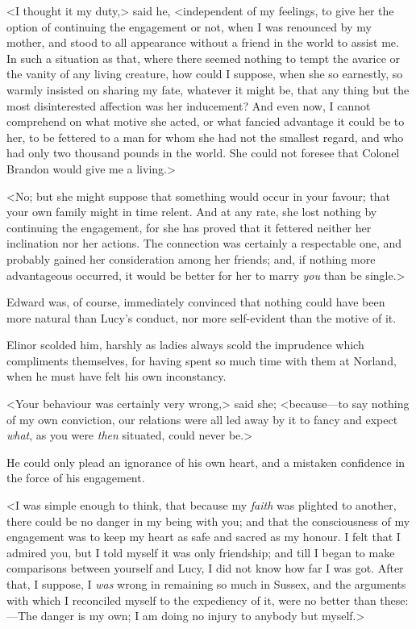 <I thought it my duty,> said he, <independent of my feelings, to give her the option of continuing the engagement or not, when I was renounced by my mother, and stood to all appearance without a friend in the world to assist me. In such a situation as that, where there seemed nothing to tempt the avarice or the vanity of any living creature, how could I suppose, when she so earnestly, so warmly insisted on sharing my fate, whatever it might be, that any thing but the most disinterested affection was her inducement? And even now, I cannot comprehend on what motive she acted, or what fancied advantage it could be to her, to be fettered to a man for whom she had not the smallest regard, and who had only two thousand pounds in the world. She could not foresee that Colonel Brandon would give me a living.>

<No; but she might suppose that something would occur in your favour; that your own family might in time relent. And at any rate, she lost nothing by continuing the engagement, for she has proved that it fettered neither her inclination nor her actions. The connection was certainly a respectable one, and probably gained her consideration among her friends; and, if nothing more advantageous occurred, it would be better for her to marry \textit{you} than be single.>

Edward was, of course, immediately convinced that nothing could have been more natural than Lucy's conduct, nor more self-evident than the motive of it.

Elinor scolded him, harshly as ladies always scold the imprudence which compliments themselves, for having spent so much time with them at Norland, when he must have felt his own inconstancy.

<Your behaviour was certainly very wrong,> said she; <because—to say nothing of my own conviction, our relations were all led away by it to fancy and expect \textit{what}, as you were \textit{then} situated, could never be.>

He could only plead an ignorance of his own heart, and a mistaken confidence in the force of his engagement.

<I was simple enough to think, that because my \textit{faith} was plighted to another, there could be no danger in my being with you; and that the consciousness of my engagement was to keep my heart as safe and sacred as my honour. I felt that I admired you, but I told myself it was only friendship; and till I began to make comparisons between yourself and Lucy, I did not know how far I was got. After that, I suppose, I \textit{was} wrong in remaining so much in Sussex, and the arguments with which I reconciled myself to the expediency of it, were no better than these:—The danger is my own; I am doing no injury to anybody but myself.>


